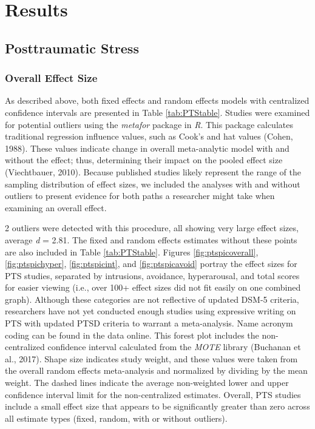 \documentclass[man]{apa6}
\theoremstyle{definition}
\theoremstyle{definition}
\theoremstyle{definition}
\theoremstyle{remark}
\begin{document}
\section{Results}\label{results}

\subsection{Posttraumatic Stress}\label{posttraumatic-stress-1}

\subsubsection{Overall Effect Size}\label{overall-effect-size}

As described above, both fixed effects and random effects models with
centralized confidence intervals are presented in Table
\ref{tab:PTStable}. Studies were examined for potential outliers using
the \emph{metafor} package in \emph{R}. This package calculates
traditional regression influence values, such as Cook's and hat values
(Cohen, 1988). These values indicate change in overall meta-analytic
model with and without the effect; thus, determining their impact on the
pooled effect size (Viechtbauer, 2010). Because published studies likely
represent the range of the sampling distribution of effect sizes, we
included the analyses with and without outliers to present evidence for
both paths a researcher might take when examining an overall effect.

2 outliers were detected with this procedure, all showing very large
effect sizes, average \emph{d} = 2.81. The fixed and random effects
estimates without these points are also included in Table
\ref{tab:PTStable}. Figures \ref{fig:ptspicoverall},
\ref{fig:ptspichyper}, \ref{fig:ptspicint}, and \ref{fig:ptspicavoid}
portray the effect sizes for PTS studies, separated by intrusions,
avoidance, hyperarousal, and total scores for easier viewing (i.e., over
100+ effect sizes did not fit easily on one combined graph). Although
these categories are not reflective of updated DSM-5 criteria,
researchers have not yet conducted enough studies using expressive
writing on PTS with updated PTSD criteria to warrant a meta-analysis.
Name acronym coding can be found in the data online. This forest plot
includes the non-centralized confidence interval calculated from the
\emph{MOTE} library (Buchanan et al., 2017). Shape size indicates study
weight, and these values were taken from the overall random effects
meta-analysis and normalized by dividing by the mean weight. The dashed
lines indicate the average non-weighted lower and upper confidence
interval limit for the non-centralized estimates. Overall, PTS studies
include a small effect size that appears to be significantly greater
than zero across all estimate types (fixed, random, with or without
outliers).
\end{document}
